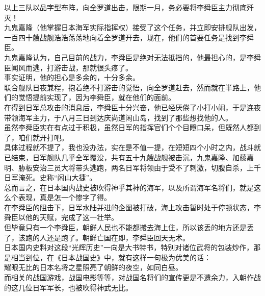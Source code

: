 \begin{multicols}{\theparacolNo}
以上三队以品字型布阵，向全罗道出击，限期一月，务必要将李舜臣主力彻底歼灭！\\

九鬼嘉隆（他掌握日本海军实际指挥权）接受了这个任务，并立即安排舰队出发，一百四十艘战舰浩浩荡荡地向着全罗道开去，现在，他们的首要任务是找到李舜臣。\\

九鬼嘉隆认为，自己目前的战力，李舜臣是绝对无法抵挡的，他最担心的，是李舜臣闻风而逃，打游击战，那就很头疼了。\\

事实证明，他的担心是多余的，十分多余。\\

联合舰队日夜兼程，抱着绝不打游击的觉悟，向全罗道赶去，然而就在半路上，他们的觉悟提前实现了，因为李舜臣，就在他们的面前。\\

在得到日军总攻击的消息后，李舜臣十分兴奋，他已经厌倦了小打小闹，于是连夜带领海军主力，于八月三日到达庆尚道闲山岛，找到了那些想找他的人。\\

虽然李舜臣实在有点过于积极，虽然日军的指挥官们个个目瞪口呆，但既然人都到了，咱们就开打吧。\\

具体过程就不提了，我也没办法，实在是不值一提，在短短四个小时之内，战斗就已结束，日军舰队几乎全军覆没，共有五十九艘战舰被击沉，九鬼嘉隆、加藤嘉明、胁板安治三员大将带头逃跑，两名日军将领由于受不了刺激，切腹自杀，上千日军淹死。史称“闲山大捷”。\\

总而言之，在日本国内战史被吹得神乎其神的海军，以及所谓海军名将们，就是这么个表现，真是怎一个惨字了得。\\

在李舜臣的阻击下，日军水陆并进的企图被打破，海上攻击暂时处于停顿状态，李舜臣以他的天赋，完成了这一壮举。\\

但毕竟只有一个李舜臣，朝鲜人民也不能都搬去海上住，所以该丢的地方还是丢了，该跑的人还是跑了。朝鲜亡国在即，李舜臣回天无术。\\

日本国内史料对这段“光辉历史”一向是大书特书，特别对诸位武将的包装炒作，那是相当到位，在《日本战国史》中，就有这样一句极为优美的话：\\

耀眼无比的日本名将之星照亮了朝鲜的夜空，如同白昼。\\

而相关的战国游戏，战国电影等等，对战国名将们的宣传更是不遗余力，入朝作战的这几位日军军长，也被吹得神武无比。\\


\end{multicols}
